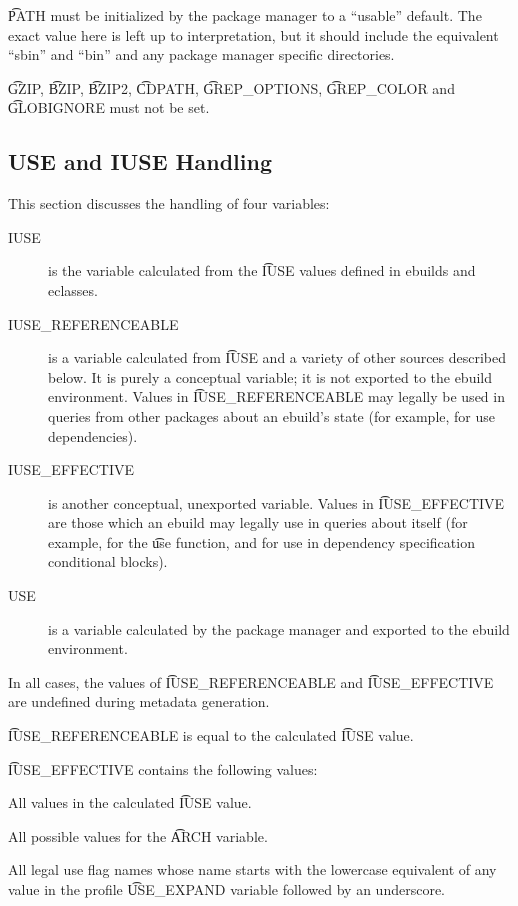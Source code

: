 \t{PATH} must be initialized by the package manager to a ``usable'' default.  The exact value here
is left up to interpretation, but it should include the equivalent ``sbin'' and ``bin'' and any
package manager specific directories.

\t{GZIP}, \t{BZIP}, \t{BZIP2}, \t{CDPATH}, \t{GREP\_OPTIONS}, \t{GREP\_COLOR} and \t{GLOBIGNORE}
must not be set.

\subsection{USE and IUSE Handling}
\label{sec:use-iuse-handling}

This section discusses the handling of four variables:

\begin{description}
\item[IUSE] is the variable calculated from the \t{IUSE} values defined in ebuilds and eclasses.
\item[IUSE\_REFERENCEABLE] is a variable calculated from \t{IUSE} and a variety of other sources
    described below. It is purely a conceptual variable; it is not exported to the ebuild
    environment. Values in \t{IUSE\_REFERENCEABLE} may legally be used in queries from other
    packages about an ebuild's state (for example, for use dependencies).
\item[IUSE\_EFFECTIVE] is another conceptual, unexported variable. Values in \t{IUSE\_EFFECTIVE} are
    those which an ebuild may legally use in queries about itself (for example, for the \t{use}
    function, and for use in dependency specification conditional blocks).
\item[USE] is a variable calculated by the package manager and exported to the ebuild environment.
\end{description}

In all cases, the values of \t{IUSE\_REFERENCEABLE} and \t{IUSE\_EFFECTIVE} are undefined during
metadata generation.

\t{IUSE\_REFERENCEABLE} is equal to the calculated \t{IUSE} value.

\t{IUSE\_EFFECTIVE} contains the following values:

\begin{compactitem}
\item All values in the calculated \t{IUSE} value.
\item All possible values for the \t{ARCH} variable.
\item All legal use flag names whose name starts with the lowercase equivalent of any value in
    the profile \t{USE\_EXPAND} variable followed by an underscore.
\end{compactitem}

